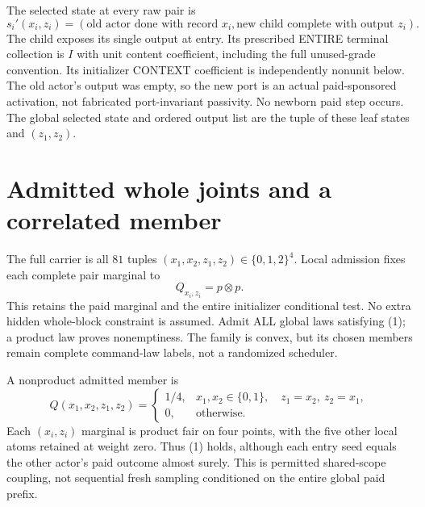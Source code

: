 \documentclass[11pt]{article}
\begin{document}
The selected state at every raw pair is
\[
 s_i'(x_i,z_i)=(\text{old actor done with record }x_i,
                 \text{new child complete with output }z_i).
\]
The child exposes its single output at entry. Its prescribed ENTIRE terminal collection is $I$ with unit content coefficient, including the full unused-grade convention. Its initializer CONTEXT coefficient is independently nonunit below. The old actor's output was empty, so the new port is an actual paid-sponsored activation, not fabricated port-invariant passivity. No newborn paid step occurs. The global selected state and ordered output list are the tuple of these leaf states and $(z_1,z_2)$.

\section{Admitted whole joints and a correlated member}
The full carrier is all $81$ tuples $(x_1,x_2,z_1,z_2)\in\{0,1,2\}^4$. Local admission fixes each complete pair marginal to
\[
                  Q_{x_i,z_i}=p\otimes p.              \tag{1}
\]
This retains the paid marginal and the entire initializer conditional test. No extra hidden whole-block constraint is assumed. Admit ALL global laws satisfying (1); a product law proves nonemptiness. The family is convex, but its chosen members remain complete command-law labels, not a randomized scheduler.

A nonproduct admitted member is
\[
 Q(x_1,x_2,z_1,z_2)=\begin{cases}
 1/4,&x_1,x_2\in\{0,1\},\quad z_1=x_2,\ z_2=x_1,\\
 0,&\text{otherwise}.
 \end{cases}                                           \tag{2}
\]
Each $(x_i,z_i)$ marginal is product fair on four points, with the five other local atoms retained at weight zero. Thus (1) holds, although each entry seed equals the other actor's paid outcome almost surely. This is permitted shared-scope coupling, not sequential fresh sampling conditioned on the entire global paid prefix.
\end{document}
